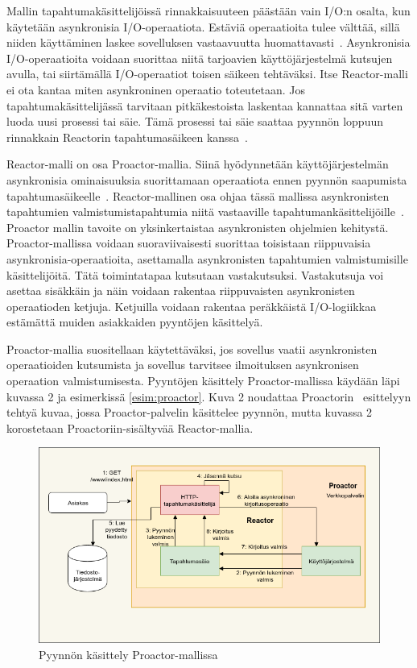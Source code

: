 \documentclass[finnish]{tktltiki2}
\theoremstyle{definition}
\theoremstyle{remark}
\begin{document}
Mallin tapahtumakäsittelijöissä rinnakkaisuuteen päästään
vain I/O:n osalta, kun käytetään asynkronisia
I/O-operaatiota.
Estäviä operaatioita tulee välttää,
sillä niiden käyttäminen laskee sovelluksen
vastaavuutta huomattavasti~\cite{schmidt_reactor:_1995}.
Asynkronisia I/O-operaatioita
voidaan suorittaa niitä tarjoavien käyttöjärjestelmä kutsujen
avulla, tai siirtämällä I/O-operaatiot toisen säikeen tehtäväksi.
Itse Reactor-malli ei ota kantaa miten asynkroninen operaatio toteutetaan.
Jos tapahtumakäsittelijässä tarvitaan pitkäkestoista laskentaa
kannattaa sitä varten luoda uusi prosessi tai säie. Tämä
prosessi tai säie saattaa pyynnön loppuun rinnakkain
Reactorin tapahtumasäikeen kanssa~\cite{schmidt_reactor:_1995}.

Reactor-malli on osa Proactor-mallia.
Siinä hyödynnetään käyttöjärjestelmän asynkronisia ominaisuuksia suorittamaan
operaatiota ennen pyynnön saapumista tapahtumasäikeelle~\cite{pyarali_proactor_1997}.
Reactor-mallinen osa ohjaa tässä mallissa asynkronisten tapahtumien
valmistumistapahtumia niitä vastaaville tapahtumankäsittelijöille~\cite{pyarali_proactor_1997}.
Proactor mallin tavoite on yksinkertaistaa asynkronisten ohjelmien kehitystä.
Proactor-mallissa voidaan suoraviivaisesti suorittaa toisistaan riippuvaisia
asynkronisia-operaatioita, asettamalla asynkronisten tapahtumien valmistumisille
käsittelijöitä.
Tätä toimintatapaa kutsutaan vastakutsuksi. 
Vastakutsuja voi asettaa sisäkkäin ja näin voidaan rakentaa riippuvaisten
asynkronisten operaatioden ketjuja. Ketjuilla voidaan
rakentaa peräkkäistä I/O-logiikkaa estämättä muiden asiakkaiden
pyyntöjen käsittelyä.

Proactor-mallia suositellaan käytettäväksi, jos sovellus vaatii
asynkronisten operaatioiden kutsumista ja sovellus tarvitsee ilmoituksen
asynkronisen operaation valmistumisesta.
Pyyntöjen käsittely Proactor-mallissa käydään läpi kuvassa 2 ja
esimerkissä \autoref{esim:proactor}.
Kuva 2 noudattaa Proactorin~\cite{pyarali_proactor_1997} esittelyyn tehtyä
kuvaa, jossa Proactor-palvelin käsittelee pyynnön, mutta kuvassa 2 
korostetaan Proactoriin-sisältyvää Reactor-mallia.
\begin{figure}
    \caption{Pyynnön käsittely Proactor-mallissa~\cite{pyarali_proactor_1997}}
\includegraphics[scale=0.5]{Proactor.png}
\end{figure}
\end{document}
